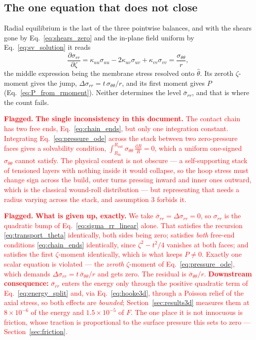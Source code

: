 \documentclass[11pt]{article}
\newcommand{\flagline}[1]{\par\medskip\noindent\textcolor{red}{\textbf{Flagged.}
  #1}\par\medskip}
\begin{document}
\subsection{The one equation that does not close}\label{sec:obstruction}
Radial equilibrium is the last of the three pointwise balances, and with the
shears gone by Eq.~\eqref{eq:shears_zero} and the in-plane field uniform by
Eq.~\eqref{eq:sv_solution} it reads
\begin{equation}\label{eq:pressure_ode}
    \boxed{\;\frac{\partial \sigma_{rr}}{\partial \zeta}
      = \kappa_{uu}\sigma_{uu} - 2\kappa_{uv}\sigma_{uv}
        + \kappa_{vv}\sigma_{vv}
      = \frac{\sigma_{\theta\theta}}{r},\;}
\end{equation}
the middle expression being the membrane stress resolved onto $\hat\theta$. Its
zeroth $\zeta$-moment gives the jump, $\Delta\sigma_{rr}
= t\,\sigma_{\theta\theta}/r$, and its first moment gives $P$
(Eq.~\ref{eq:P_from_rmoment}). Neither determines the level $\bar\sigma_{rr}$,
and that is where the count fails.

\flagline{\textbf{The single inconsistency in this document.} The contact chain
has two free ends, Eq.~\eqref{eq:chain_ends}, but only one integration constant.
Integrating Eq.~\eqref{eq:pressure_ode} across the stack between two
zero-pressure faces gives a solvability condition,
$\int_{R_{\mathrm{in}}}^{R_{\mathrm{out}}}\sigma_{\theta\theta}\,
\frac{\mathrm dR}{R} = 0$, which a uniform one-signed $\sigma_{\theta\theta}$
cannot satisfy. The physical content is not obscure --- a self-supporting stack
of tensioned layers with nothing inside it would collapse, so the hoop stress
must change sign across the build, outer turns pressing inward and inner ones
outward, which is the classical wound-roll distribution --- but representing that
needs a radius varying across the stack, and assumption 3 forbids it.}

\flagline{\textbf{What is given up, exactly.} We take
$\bar\sigma_{rr} = \Delta\sigma_{rr} = 0$, so $\sigma_{rr}$ is the quadratic bump
of Eq.~\eqref{eq:sigma_rr_linear} alone. That satisfies the recursion
\eqref{eq:transport_theta} identically, both sides being zero; satisfies
\emph{both} free-end conditions \eqref{eq:chain_ends} identically, since
$\zeta^{2}-t^{2}/4$ vanishes at both faces; and satisfies the first
$\zeta$-moment identically, which is what keeps $P \ne 0$. Exactly one scalar
equation is violated --- the \emph{zeroth} $\zeta$-moment of
Eq.~\eqref{eq:pressure_ode}, which demands
$\Delta\sigma_{rr} = t\,\bar\sigma_{\theta\theta}/r$ and gets zero. The residual
is $\bar\sigma_{\theta\theta}/r$. \textbf{Downstream consequence:}
$\bar\sigma_{rr}$ enters the energy only through the positive quadratic term of
Eq.~\eqref{eq:energy_split} and, via Eq.~\eqref{eq:hooke3d}, through a Poisson
relief of the axial stress, so both effects are \emph{bounded};
Section~\ref{sec:results3d} measures them at $8\times10^{-6}$ of the energy and
$1.5\times10^{-5}$ of $F$. The one place it is not innocuous is friction, whose
traction is proportional to the surface pressure this sets to zero ---
Section~\ref{sec:friction}.}
\end{document}
